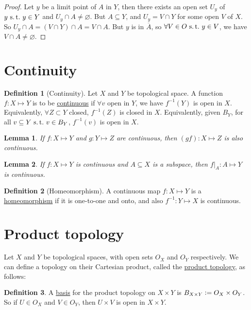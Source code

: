 \documentclass[12pt]{amsart}
\newcommand{\suchthat}{\operatorname{\thinspace s.t. \thinspace}}
\theoremstyle{plain}
\newtheorem*{lem}{Lemma}
\theoremstyle{remark}
\theoremstyle{definition}
\newtheorem*{define}{Definition}
\begin{document}
\begin{proof}
	Let $y$ be a limit point of $A$ in $Y$, then there exists an open set $U_y$ of $y \suchthat y \in Y$ and $U_y \cap A \neq \varnothing$. But $A \subseteq Y$, and $U_y = V \cap Y$ for some open $V$ of $X$. So $U_y \cap A = (V\cap Y)\cap A = V \cap A$. But $y$ is in $\overline{A}$, so $\forall V \in O \suchthat y \in V$, we have $V \cap A \neq \varnothing$.   
\end{proof}

\section*{Continuity}
\begin{define}[Continuity]
	Let $X$ and $Y$ be topological space. A function $f: X \mapsto Y$ is to be \ul{continuous} if $\forall v$ open in $Y$, we have $f^{-1}(Y)$ is open in $X$.
	\newline
	Equivalently, $\forall Z \subset Y$ closed, $f^{-1}(Z)$ is closed in $X$.
	Equivalently, given $B_Y$, for all $v \subseteq Y \suchthat v \in B_Y$, $f^{-1}(v)$ is open in $X$. 
\end{define}

\begin{lem}
	If $f:X \mapsto Y$ and $g: Y \mapsto Z$ are continuous, then $(gf):X \mapsto Z$ is also continuous.
\end{lem}

\begin{lem}
	If $f:X \mapsto Y$ is continuous and $A \subseteq X$ is a subspace, then $f|_A: A \mapsto Y$ is continuous.
\end{lem}
\begin{define}[Homeomorphism]
	A continuous map $f:X \mapsto Y$ is a \ul{homeomorphism} if it is one-to-one and onto, and also $f^{-1}:Y \mapsto X$ is continuous.
\end{define}
\section*{Product topology}
Let $X$ and $Y$ be topological spaces, with open sets $O_X$ and $O_Y$ respectively. We can define a topology on their Cartesian product, called the \ul{product topology}, as follows:
\begin{define}
	A \ul{basis} for the product topology on $X \times Y$ is $B_{X \times Y} \vcentcolon = O_X \times O_Y$. So if $U \in O_X$ and $V \in O_Y$, then $U \times V$ is open in $X \times Y$.
\end{define}
\end{document}
